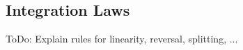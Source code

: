 




\subsection{Integration Laws} 
ToDo: Explain rules for linearity, reversal, splitting, ...









